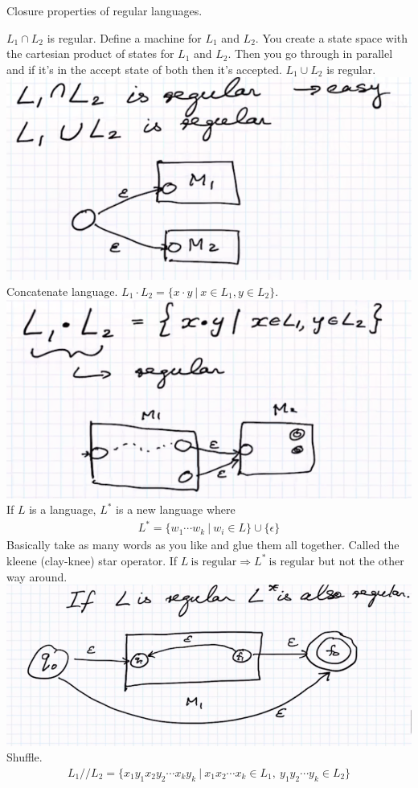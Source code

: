 \documentclass[class=scrartcl, crop=false]{standalone}
\begin{document}
Closure properties of regular languages.
\begin{enumerate}
  \ii $L_1 \cap L_2$ is regular. Define a machine for $L_1$ and $L_2$. You
  create a state space with the cartesian product of states for $L_1$ and $L_2$.
  Then you go through in parallel and if it's in the accept state of both then
  it's accepted. \ii
  $L_1 \cup L_2$ is regular. \\
  \includegraphics[width=\textwidth]{closure_union} \ii
  Concatenate language. $L_1 \cdot L_2 = \{x \cdot y \ | \ x \in L_1, y \in L_2\}$. \\
  \includegraphics[width=\textwidth]{closure_concatenate} \ii If $L$ is a
  language, $L^*$ is a new language where
  \begin{gather*}
    L^* = \{w_1 \cdots w_k \ | \ w_i \in L\} \cup \{\epsilon\}
  \end{gather*}
  Basically take as many words as you like and glue them all together. Called the kleene (clay-knee) star operator. If $L \ \text{is regular} \Rightarrow L^* \ \text{is regular}$ but not the other way around. \\
  \includegraphics[width=\textwidth]{closure_star} \ii Shuffle.
  \begin{gather*}
    L_1 // L_2 = \{x_1y_1x_2y_2 \cdots x_ky_k \ | \ x_1x_2 \cdots x_k \in L_1, \
    y_1 y_2 \cdots y_k \in L_2\}
  \end{gather*}
\end{enumerate}
\end{document}
